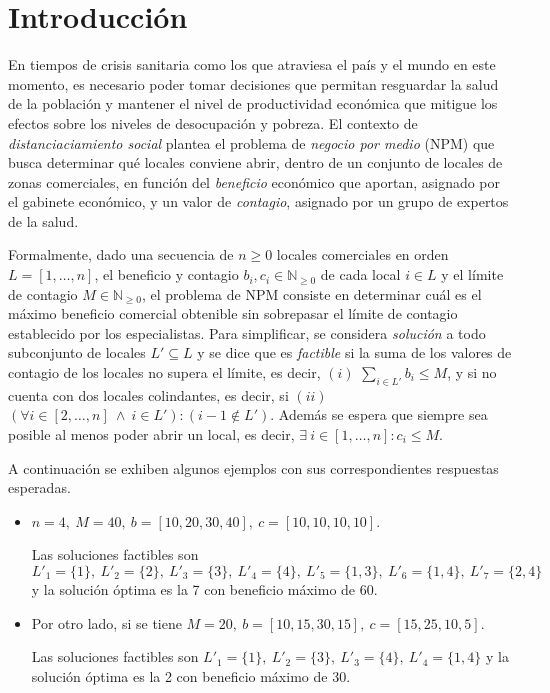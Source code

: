 \clearpage
\setcounter{page}{1}

\section{Introducción}

En tiempos de crisis sanitaria como los que atraviesa el país y el mundo en este momento, es necesario poder tomar decisiones que permitan resguardar la salud de la población y mantener el nivel de productividad económica que mitigue los efectos sobre los niveles de desocupación y pobreza. El contexto de \textit{distanciaciamiento social} plantea el problema de \textit{negocio por medio} (NPM) que busca determinar qué locales conviene abrir, dentro de un conjunto de locales de zonas comerciales, en función del \textit{beneficio} económico que aportan, asignado por el gabinete económico, y un valor de \textit{contagio}, asignado por un grupo de expertos de la salud.

Formalmente, dado una secuencia de $n \ge 0$ locales comerciales en orden $L = [ 1, \dots, n]$, el beneficio y contagio $b_i, c_i \in \mathbb{N}_{\ge0}$ de cada local $i \in L$ y el límite de contagio $M \in \mathbb{N}_{\ge 0}$, el problema de NPM consiste en determinar cuál es el máximo beneficio comercial obtenible sin sobrepasar el límite de contagio establecido por los especialistas. Para simplificar, se considera \textit{solución} a todo subconjunto de locales $L' \subseteq L$ y se dice que es \textit{factible} si la suma de los valores de contagio de los locales no supera el límite, es decir, $(i)$ $\sum_{i\in L'}b_i \le M$, y si no cuenta con dos locales colindantes, es decir, si $(ii)$ $(\forall i \in [2,\dots, n]~\wedge~i \in L') : (i-1 \not \in L')$. Además se espera que siempre sea posible al menos poder abrir un local, es decir, $\exists\ i \in [1,\dots,n] : c_i \le M$.

A continuación se exhiben algunos ejemplos con sus correspondientes respuestas esperadas. 

\begin{itemize}
\item $n=4,\ M=40,\ b=[10, 20, 30, 40],\ c=[10,10,10,10]$.

Las soluciones factibles son $L'_1=\{1\},\ L'_2=\{2\},\ L'_3=\{3\},\ L'_4=\{4\},\ L'_5=\{1,3\},\ L'_6=\{1,4\},\ L'_7=\{2,4\}$ y la solución óptima es la 7 con beneficio máximo de 60.
\item Por otro lado, si se tiene $M=20,\ b=[10, 15, 30, 15],\ c=[15,25,10,5]$.

Las soluciones factibles son $L'_1=\{1\},\ L'_2=\{3\},\ L'_3=\{4\},\ L'_4=\{1,4\}$ y la solución óptima es la 2 con beneficio máximo de 30.

\end{itemize}

